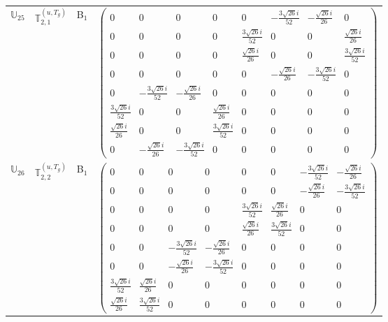 \documentclass[fleqn,10pt,landscape]{article}
\begin{document}
\begin{itemize}
\begin{center}
\begin{longtable}{c|c|c|c}
$ \mathbb{U}_{25} $ & $\mathbb{T}_{2,1}^{(u,T_{g})}$ & B$_{1}$ & $\begin{pmatrix} 0 & 0 & 0 & 0 & 0 & - \frac{3 \sqrt{26} i}{52} & - \frac{\sqrt{26} i}{26} & 0 \\ 0 & 0 & 0 & 0 & \frac{3 \sqrt{26} i}{52} & 0 & 0 & \frac{\sqrt{26} i}{26} \\ 0 & 0 & 0 & 0 & \frac{\sqrt{26} i}{26} & 0 & 0 & \frac{3 \sqrt{26} i}{52} \\ 0 & 0 & 0 & 0 & 0 & - \frac{\sqrt{26} i}{26} & - \frac{3 \sqrt{26} i}{52} & 0 \\ 0 & - \frac{3 \sqrt{26} i}{52} & - \frac{\sqrt{26} i}{26} & 0 & 0 & 0 & 0 & 0 \\ \frac{3 \sqrt{26} i}{52} & 0 & 0 & \frac{\sqrt{26} i}{26} & 0 & 0 & 0 & 0 \\ \frac{\sqrt{26} i}{26} & 0 & 0 & \frac{3 \sqrt{26} i}{52} & 0 & 0 & 0 & 0 \\ 0 & - \frac{\sqrt{26} i}{26} & - \frac{3 \sqrt{26} i}{52} & 0 & 0 & 0 & 0 & 0 \end{pmatrix}$ \\
$ \mathbb{U}_{26} $ & $\mathbb{T}_{2,2}^{(u,T_{g})}$ & B$_{1}$ & $\begin{pmatrix} 0 & 0 & 0 & 0 & 0 & 0 & - \frac{3 \sqrt{26} i}{52} & - \frac{\sqrt{26} i}{26} \\ 0 & 0 & 0 & 0 & 0 & 0 & - \frac{\sqrt{26} i}{26} & - \frac{3 \sqrt{26} i}{52} \\ 0 & 0 & 0 & 0 & \frac{3 \sqrt{26} i}{52} & \frac{\sqrt{26} i}{26} & 0 & 0 \\ 0 & 0 & 0 & 0 & \frac{\sqrt{26} i}{26} & \frac{3 \sqrt{26} i}{52} & 0 & 0 \\ 0 & 0 & - \frac{3 \sqrt{26} i}{52} & - \frac{\sqrt{26} i}{26} & 0 & 0 & 0 & 0 \\ 0 & 0 & - \frac{\sqrt{26} i}{26} & - \frac{3 \sqrt{26} i}{52} & 0 & 0 & 0 & 0 \\ \frac{3 \sqrt{26} i}{52} & \frac{\sqrt{26} i}{26} & 0 & 0 & 0 & 0 & 0 & 0 \\ \frac{\sqrt{26} i}{26} & \frac{3 \sqrt{26} i}{52} & 0 & 0 & 0 & 0 & 0 & 0 \end{pmatrix}$ \\

\end{longtable}
\end{center}
\end{itemize}
\end{document}
